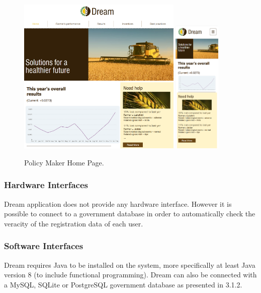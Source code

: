 \documentclass{article}
\begin{document}
    \begin{figure} [h]
        \centering
        \includegraphics[width=0.7\textwidth]{images/interfaces/PolicyMakerWeb.png}
        \quad
        \includegraphics[width=0.2\textwidth]{images/interfaces/PolicyMakerApp.png}
        \quad
        \caption{\label{fig:frog}Policy Maker Home Page.}
    \end{figure}
    
    \newpage

\subsubsection{Hardware Interfaces}
Dream application does not provide any hardware interface. However it is possible to connect to a government database in order to automatically check the veracity of the registration data of each user.

\subsubsection{Software Interfaces}
Dream requires Java to be installed on the system, more specifically at least Java version 8 (to include functional programming). Dream can also be connected with a MySQL, SQLite or PostgreSQL government database as presented in 3.1.2.
\end{document}
